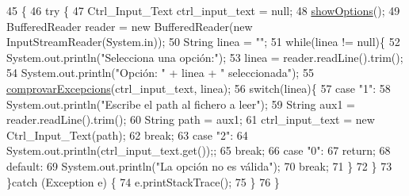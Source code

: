 \begin{DoxyCode}
45                                            \{
46     \textcolor{keywordflow}{try} \{
47         Ctrl\_Input\_Text ctrl\_input\_text = null;
48         \hyperlink{classpersistencia_1_1input_1_1Driver____Ctrl__Input__Text_a51d02aa85468b0924d13e4060106459e}{showOptions}();
49         BufferedReader reader = \textcolor{keyword}{new} BufferedReader(\textcolor{keyword}{new} InputStreamReader(System.in));
50         String linea = \textcolor{stringliteral}{""};
51         \textcolor{keywordflow}{while}(linea != null)\{
52             System.out.println(\textcolor{stringliteral}{"Selecciona una opción:"});
53             linea = reader.readLine().trim();
54             System.out.println(\textcolor{stringliteral}{"Opción: "} + linea + \textcolor{stringliteral}{" seleccionada"});
55             \hyperlink{classpersistencia_1_1input_1_1Driver____Ctrl__Input__Text_a3e4149adb11b97b330ce77f1c2b5ae9c}{comprovarExcepcions}(ctrl\_input\_text, linea);
56             \textcolor{keywordflow}{switch}(linea)\{
57                 \textcolor{keywordflow}{case} \textcolor{stringliteral}{"1"}:
58                     System.out.println(\textcolor{stringliteral}{"Escribe el path al fichero a leer"});
59                     String aux1 = reader.readLine().trim();
60                     String path = aux1;
61                     ctrl\_input\_text = \textcolor{keyword}{new} Ctrl\_Input\_Text(path);
62                 \textcolor{keywordflow}{break};
63                 \textcolor{keywordflow}{case} \textcolor{stringliteral}{"2"}:
64                     System.out.println(ctrl\_input\_text.get());;
65                 \textcolor{keywordflow}{break};
66                 \textcolor{keywordflow}{case} \textcolor{stringliteral}{"0"}:
67                     \textcolor{keywordflow}{return};
68                 \textcolor{keywordflow}{default}:
69                     System.out.println(\textcolor{stringliteral}{"La opción no es válida"});
70                 \textcolor{keywordflow}{break};
71             \}
72         \}
73     \}\textcolor{keywordflow}{catch} (Exception e) \{
74         e.printStackTrace();
75     \}
76     \}
\end{DoxyCode}
\mbox{\label{classpersistencia_1_1input_1_1Driver____Ctrl__Input__Text_a51d02aa85468b0924d13e4060106459e}} 
